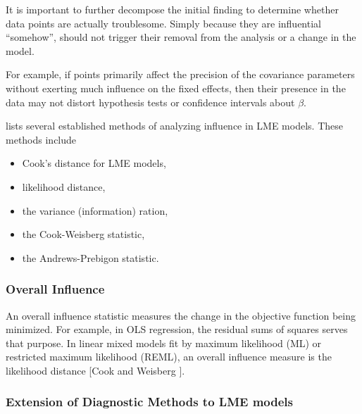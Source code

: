 \documentclass[12pt, a4paper]{report}
\theoremstyle{plain}
\theoremstyle{definition}
\theoremstyle{remark}
\begin{document}
	It is important to further decompose the initial finding to determine whether data points are actually troublesome. Simply because they are influential “somehow”, should not trigger their removal from the analysis or a change in the model. 
	
	
	For example, if points primarily affect the precision of the covariance parameters without exerting much influence on the fixed effects, then their presence in the data may not distort hypothesis
	tests or confidence intervals about $\beta$.
	
	
	
	
	
	
	\citet{Zewotir} lists several established methods of analyzing influence in LME models. These methods include \begin{itemize}
		\item Cook's distance for LME models,
		\item {} likelihood distance,
		\item the variance (information) ration,
		\item the  Cook-Weisberg statistic,
		\item the  Andrews-Prebigon statistic.
	\end{itemize}
	
	
	
	
	\subsubsection{Overall Influence}
	An overall influence statistic measures the change in the objective function being minimized. For example, in
	OLS regression, the residual sums of squares serves that purpose. In linear mixed models fit by
	 maximum likelihood (ML) or  restricted maximum likelihood (REML), an overall influence measure is the  likelihood distance [Cook and Weisberg ].
	
	
	\subsubsection{Extension of Diagnostic Methods to LME models}
	
\end{document}
